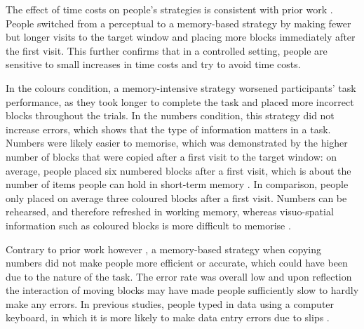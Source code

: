 
The effect of time costs on people's strategies is consistent with prior work \citep{Gray2006, Morgan2009, Waldron2007}. People switched from a perceptual to a memory-based strategy by making fewer but longer visits to the target window and placing more blocks immediately after the first visit. This further confirms that in a controlled setting, people are sensitive to small increases in time costs and try to avoid time costs.

In the colours condition, a memory-intensive strategy worsened participants' task performance, as they took longer to complete the task and placed more incorrect blocks throughout the trials. In the numbers condition, this strategy did not increase errors, which shows that the type of information matters in a task. Numbers were likely easier to memorise, which was demonstrated by the higher number of blocks that were copied after a first visit to the target window: on average, people placed six numbered blocks after a first visit, which is about the number of items people can hold in short-term memory \citep{Miller1956}. In comparison, people only placed on average three coloured blocks after a first visit. Numbers can be rehearsed, and therefore refreshed in working memory, whereas visuo-spatial information such as coloured blocks is more difficult to memorise \citep{Baddeley1974}. 

Contrary to prior work however \citep{Gray2004, Soboczenski2013}, a memory-based strategy when copying numbers did not make people more efficient or accurate, which could have been due to the nature of the task. The error rate was overall low and upon reflection the interaction of moving blocks may have made people sufficiently slow to hardly make any errors. In previous studies, people typed in data using a computer keyboard, in which it is more likely to make data entry errors due to slips \citep{Oladimeji2011}.
 
